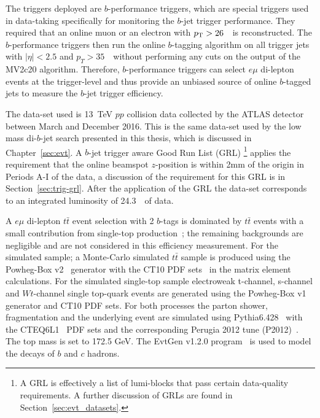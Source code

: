 The triggers deployed are $b$-performance triggers, which are special triggers used in data-taking specifically for monitoring the $b$-jet trigger performance.
They required that an online muon or an electron with $p_{\mathrm{T}}{} > 26$~\GeV~is reconstructed.
The $b$-performance triggers then run the online $b$-tagging algorithm on all trigger jets with $|\eta|<2.5$ and
$p_{T}>35$~\GeV~without performing any cuts on the output of the MV2c20 algorithm.
Therefore, $b$-performance triggers can select $e\mu$ di-lepton events at the trigger-level
and thus provide an unbiased source of online $b$-tagged jets to measure the $b$-jet trigger efficiency.

The data-set used is 13~TeV $pp$ collision data collected by the ATLAS detector between March and December 2016.
This is the same data-set used by the low mass di-$b$-jet search presented in this thesis, which is discussed in Chapter~\ref{sec:evt}.
A $b$-jet trigger aware Good Run List (GRL) 
\footnote{A GRL is effectively a list of lumi-blocks that pass certain data-quality requirements.
  A further discussion of GRLs are found in Section~\ref{sec:evt_datasets}.}
applies the requirement that the online beamspot $z$-position is within 2mm of the origin in Periods A-I of the data,
a discussion of the requirement for this GRL is in Section~\ref{sec:trig-grl}. 
After the application of the GRL the data-set corresponds to an integrated luminosity of 24.3~\ifb~of data.

A $e\mu$ di-lepton $t\bar{t}$ event selection with 2 $b$-tags
is dominated by $t\bar{t}$ events with a small contribution from single-top production~\cite{trig-ttbar};
the remaining backgrounds are negligible and are not considered in this efficiency measurement.
For the simulated sample; a Monte-Carlo simulated $t\bar{t}$ sample is produced using the
Powheg-Box v2~\cite{trig-powheg} generator with the CT10 PDF sets~\cite{trig-CT10} in the matrix element calculations.
For the simulated single-top sample electroweak t-channel, s-channel and $Wt$-channel single top-quark events are generated using the Powheg-Box v1 generator and CT10 PDF sets.
For both processes the parton shower, fragmentation and the underlying event are simulated using Pythia6.428~\cite{trig-pythia6} with the CTEQ6L1~\cite{trig-CTEQ6L1} PDF sets
and the corresponding Perugia 2012 tune (P2012)~\cite{trig-perugia}.
The top mass is set to 172.5 GeV.
The EvtGen v1.2.0 program~\cite{trig-evtGen} is used to model the decays of $b$ and $c$ hadrons.

